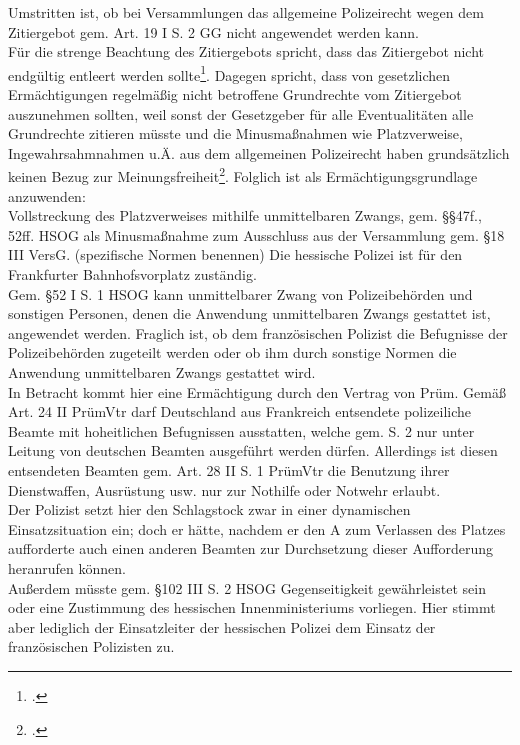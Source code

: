 \documentclass[widefront, ngerman]{jura}
\begin{document}
Umstritten ist, ob bei Versammlungen das allgemeine Polizeirecht wegen dem Zitiergebot gem. Art. 19 I S. 2 GG nicht angewendet werden kann.\\
Für die strenge Beachtung des Zitiergebots spricht, dass das Zitiergebot nicht endgültig entleert werden sollte\footcite[Kniesel/Poscher][J Rn. 144]{HandbuchPolizeirecht}. Dagegen spricht, dass von gesetzlichen Ermächtigungen regelmäßig nicht betroffene Grundrechte vom Zitiergebot auszunehmen sollten, weil sonst der Gesetzgeber für alle Eventualitäten alle Grundrechte zitieren müsste und die Minusmaßnahmen wie Platzverweise, Ingewahrsahmnahmen u.Ä. aus dem allgemeinen Polizeirecht haben grundsätzlich keinen Bezug zur Meinungsfreiheit\footcite[(199f.)]{schnurVR2000}.
Folglich ist als Ermächtigungsgrundlage anzuwenden:\\
Vollstreckung des Platzverweises mithilfe unmittelbaren Zwangs, gem. §§47f., 52ff. HSOG als Minusmaßnahme zum Ausschluss aus der Versammlung gem. §18 III VersG.
(spezifische Normen benennen)
\levelup {}
Die hessische Polizei ist für den Frankfurter Bahnhofsvorplatz zuständig.\\
Gem. §52 I S. 1 HSOG kann unmittelbarer Zwang von Polizeibehörden und sonstigen Personen, denen die Anwendung unmittelbaren Zwangs gestattet ist, angewendet werden.
Fraglich ist, ob dem französischen Polizist die Befugnisse der Polizeibehörden zugeteilt werden oder ob ihm durch sonstige Normen die Anwendung unmittelbaren Zwangs gestattet wird.\\
In Betracht kommt hier eine Ermächtigung durch den Vertrag von Prüm. Gemäß Art. 24 II PrümVtr darf Deutschland aus Frankreich entsendete polizeiliche Beamte mit hoheitlichen Befugnissen ausstatten, welche gem. S. 2 nur unter Leitung von deutschen Beamten ausgeführt werden dürfen. Allerdings ist diesen entsendeten Beamten gem. Art. 28 II S. 1 PrümVtr die Benutzung ihrer Dienstwaffen, Ausrüstung usw. nur zur Nothilfe oder Notwehr erlaubt.\\
Der Polizist setzt hier den Schlagstock zwar in einer dynamischen Einsatzsituation ein; doch er hätte, nachdem er den A zum Verlassen des Platzes aufforderte auch einen anderen Beamten zur Durchsetzung dieser Aufforderung heranrufen können.\\
Außerdem müsste gem. §102 III S. 2 HSOG Gegenseitigkeit gewährleistet sein oder eine Zustimmung des hessischen Innenministeriums vorliegen.
Hier stimmt aber lediglich der Einsatzleiter der hessischen Polizei dem Einsatz der französischen Polizisten zu.
\end{document}
